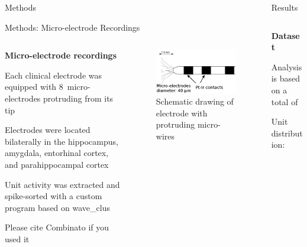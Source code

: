 \documentclass{beamer}
\renewcommand{\emph}{\textbf}
\newenvironment{wideitemize}{\itemize\addtolength{\itemsep}{.2em}\addtolength{\labelsep}{.1ex}}{\enditemize}
\begin{document}
\begin{frame}[t]
\begin{columns}[T]
\begin{column}{.32\linewidth}
\begin{block}{Methods}
\end{block}

\begin{block}{Methods: Micro-electrode Recordings}
\begin{columns}[T]
\begin{column}{.55\linewidth}
\emph{Micro-electrode recordings}
\begin{wideitemize}
\item Each clinical electrode was equipped with 8~micro-electrodes protruding from its tip
\item Electrodes were located bilaterally in the hippocampus, amygdala, entorhinal cortex, and parahippocampal cortex
\item Unit activity was extracted and spike-sorted with a custom program based on wave\_clus \parencite{quian_quiroga_unsupervised_2004}
\item Please cite Combinato if you used it
\end{wideitemize}
\end{column}
\begin{column}{.35\linewidth}
\begin{figure}
\label{fig:electrodes}
\includegraphics[width=.9\linewidth]{electrodes.png}
\caption{Schematic drawing of electrode with protruding micro-wires}
\end{figure}
\end{column}
\end{columns}
\end{block}



\end{column}
\begin{column}{.32\linewidth}

\begin{block}{Results}
\begin{columns}[T]
\begin{column}{.95\linewidth}
\emph{Dataset}
\begin{wideitemize}
\item Analysis is based on a total of 
\item Unit distribution: 
\end{wideitemize}


\end{column}
\end{columns}
\end{block}
\end{column}
\end{columns}
\end{frame}
\end{document}
